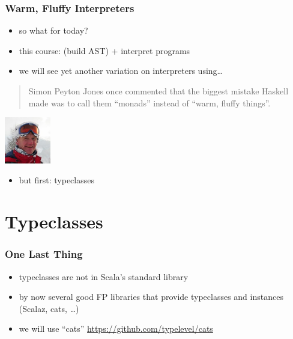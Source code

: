 \documentclass{beamer}
\begin{document}
\begin{frame}
  \frametitle{Warm, Fluffy Interpreters}
  \begin{itemize}
  \item so what for today?
  \item this course: (build AST) + interpret programs
  \item we will see yet another variation on interpreters using\ldots
  \end{itemize}
  \vspace{5mm}
  \begin{minipage}{0.75\linewidth}
    \begin{quote}
      Simon Peyton Jones once commented that the biggest mistake Haskell
      made was to call them ``monads'' instead of ``warm, fluffy things''.
    \end{quote}
  \end{minipage}
  \begin{minipage}{25mm}
    \includegraphics[width=2cm]{pics/spj-snow.jpg}
  \end{minipage}
  \vspace{5mm}
  \begin{itemize}
  \item but first: typeclasses
  \end{itemize}
\end{frame}

\section{Typeclasses}

\begin{frame}
  \frametitle{One Last Thing}
  \begin{itemize}
  \item typeclasses are not in Scala's standard library
  \item by now several good FP libraries that provide typeclasses and
    instances (Scalaz, cats, \ldots)
  \item we will use ``cats'' \url{https://github.com/typelevel/cats}
  \end{itemize}
\end{frame}
\end{document}
